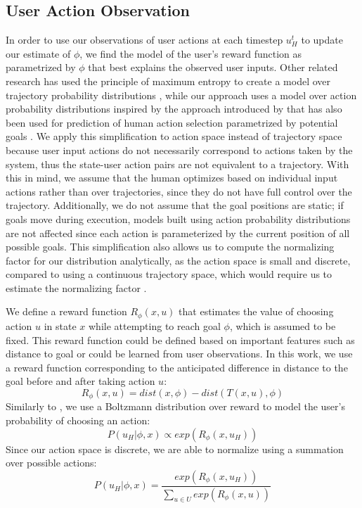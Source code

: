 \documentclass[conference]{IEEEtran}
\begin{document}
\subsection{User Action Observation}
In order to use our observations of user actions at each timestep $u_H^t$ to update our estimate of $\phi$, we find the model of the user's reward function as parametrized by $\phi$ that best explains the observed user inputs. Other related research has used the principle of maximum entropy \cite{ziebart2008maximum} to create a model over trajectory probability distributions \cite{dragan2012formalizing, javdani2015shared}, while our approach uses a model over action probability distributions inspired by the approach introduced by  \citet{ramachandran2007bayesian} that has also been used for prediction of human action selection parametrized by potential goals \cite{fisac2018probabilistically}. We apply this simplification to action space instead of trajectory space because user input actions do not necessarily correspond to actions taken by the system, thus the state-user action pairs are not equivalent to a trajectory. With this in mind, we assume that the human optimizes based on individual input actions rather than over trajectories, since they do not have full control over the trajectory. Additionally, we do not assume that the goal positions are static; if goals move during execution, models built using action probability distributions are not affected since each action is parameterized by the current position of all possible goals. This simplification also allows us to compute the normalizing factor for our distribution analytically, as the action space is small and discrete, compared to using a continuous trajectory space, which would require us to estimate the normalizing factor \cite{javdani2015shared}.

We define a reward function $R_\phi (x, u)$ that estimates the value of choosing action $u$ in state $x$ while attempting to reach goal $\phi$, which is assumed to be fixed. This reward function could be defined based on important features such as distance to goal or could be learned from user observations. In this work, we use a reward function corresponding to the anticipated difference in distance to the goal before and after taking action $u$:
\begin{equation}
R_\phi (x, u) = dist(x, \phi) - dist(T(x, u), \phi)
\end{equation}
Similarly to \citet{ramachandran2007bayesian}, we use a Boltzmann distribution over reward to model the user's probability of choosing an action:
\begin{equation}
P(u_H|\phi, x) \propto exp(R_\phi (x, u_H))
\end{equation}
Since our action space is discrete, we are able to normalize using a summation over possible actions:
\begin{equation}
P(u_H|\phi, x) = \frac{exp(R_\phi (x, u_H))}{\sum_{u \in U} exp(R_\phi (x, u))}
\end{equation}
\end{document}

